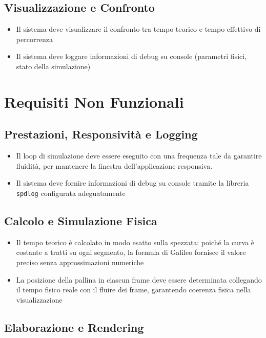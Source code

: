 \documentclass[a4paper,12pt]{article} %
\begin{document}
\subsection{Visualizzazione e Confronto}

\begin{itemize}
    \item Il sistema deve visualizzare il confronto tra tempo teorico e tempo effettivo di percorrenza
    \item Il sistema deve loggare informazioni di debug su console (parametri fisici, stato della simulazione)
\end{itemize}

\section{Requisiti Non Funzionali}

\subsection{Prestazioni, Responsività e Logging}

\begin{itemize}
    \item Il loop di simulazione deve essere eseguito con una frequenza tale da garantire fluidità, per
          mantenere la finestra dell'applicazione responsiva.
    \item Il sistema deve fornire informazioni di debug su console tramite la libreria \texttt{spdlog}
          configurata adeguatamente
\end{itemize}

\subsection{Calcolo e Simulazione Fisica}

\begin{itemize}
    \item Il tempo teorico è calcolato in modo esatto sulla spezzata: poiché la curva è costante a tratti
          su ogni segmento, la formula di Galileo fornisce il valore preciso senza approssimazioni numeriche
    \item La posizione della pallina in ciascun frame deve essere determinata collegando il tempo fisico
          reale con il fluire dei frame, garantendo coerenza fisica nella visualizzazione
\end{itemize}

\subsection{Elaborazione e Rendering}
\end{document}
